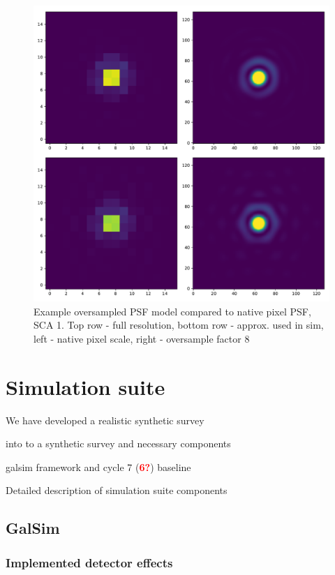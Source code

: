 \documentclass[aps,prd, amsmath,amssymb,superscriptaddress,showkeys,nofootinbib,reprint,preprintnumbers]{revtex4-1}
\newcommand{\verify}[1]{\textcolor{red}{\textbf{{#1}}}}
\begin{document}
\begin{figure}
\begin{center}
\includegraphics[width=\columnwidth]{figures/psf.pdf}
\end{center}
\caption[]{
Example oversampled PSF model compared to native pixel PSF, SCA 1. Top row - full resolution, bottom row - approx. used in sim, left - native pixel scale, right - oversample factor 8
\label{fig:pointings}}
\end{figure}


\section{Simulation suite}\label{sec:sim}

We have developed a realistic synthetic survey 

into to a synthetic survey and necessary components

galsim framework and cycle 7 (\verify{6?}) baseline

Detailed description of simulation suite components

\subsection{GalSim}
\subsubsection{Implemented detector effects}
\end{document}
